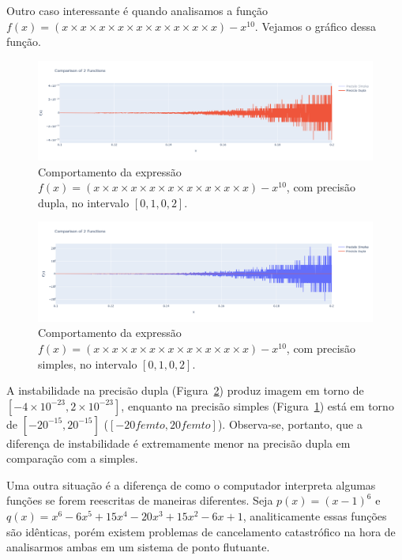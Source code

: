 Outro caso interessante é quando analisamos a função $f(x) = (x\times x\times x\times x\times x\times x\times x\times x \times x) - x^{10} $. Vejamos o gráfico dessa função.
\begin{figure}[H]
    \centering 
    \includegraphics[width=1\textwidth]{Imagens/timesXpot_literal0.png}
    \caption{Comportamento da expressão $f(x) = (x \times x \times x \times x \times x \times x \times x \times x \times x) - x^{10}$, com precisão dupla, no intervalo \([0{,}1, 0{,}2]\).}
    \label{fig:timesXpot_literal0}
\end{figure}
\begin{figure}[H]
    \centering 
    \includegraphics[width=1\textwidth]{Imagens/timesXpot_literal0_1.png}
    \caption{Comportamento da expressão $f(x) = (x \times x \times x \times x \times x \times x \times x \times x \times x) - x^{10}$, com precisão simples, no intervalo \([0{,}1, 0{,}2]\).}
    \label{fig:timesXpot_literal0_1}
\end{figure}
A instabilidade na precisão dupla (Figura~\ref{fig:timesXpot_literal0_1}) produz imagem em torno de $[-4 \times 10^{-23},2 \times 10^{-23}]$, enquanto na precisão simples (Figura~\ref{fig:timesXpot_literal0}) está em torno de $[-20^{-15},20^{-15}]$ ($[-20 femto, 20 femto]$). Observa-se, portanto, que a diferença de instabilidade é extremamente menor na precisão dupla em comparação com a simples.

Uma outra situação é a diferença de como o computador interpreta algumas funções se forem reescritas de maneiras diferentes. Seja $p(x) = (x - 1)^6$ e $q(x) = x^6 - 6x^5 + 15x^4 - 20x^3 + 15x^2 - 6x + 1$, analiticamente essas funções são idênticas, porém existem problemas de cancelamento catastrófico na hora de analisarmos ambas em um sistema de ponto flutuante.

